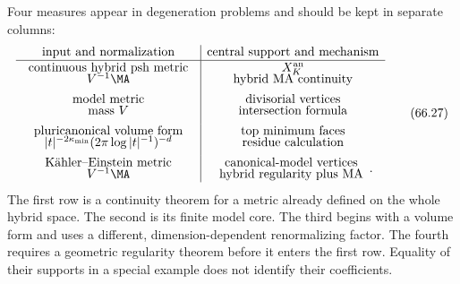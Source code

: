 Four measures appear in degeneration problems and should be kept in
separate columns:
\[
\begin{array}{c|c}
\text{input and normalization}&\text{central support and mechanism}\\
\hline
\begin{array}{c}
\text{continuous hybrid psh metric}\\[-1mm]V^{-1}\MA
\end{array}
&
\begin{array}{c}
X_K^{\mathrm{an}}\\[-1mm]\text{hybrid MA continuity}
\end{array}\\[3mm]
\begin{array}{c}
\text{model metric}\\[-1mm]\text{mass }V
\end{array}
&
\begin{array}{c}
\text{divisorial vertices}\\[-1mm]\text{intersection formula}
\end{array}\\[3mm]
\begin{array}{c}
\text{pluricanonical volume form}\\[-1mm]
|t|^{-2\kappa_{\min}}(2\pi\log|t|^{-1})^{-d}
\end{array}
&
\begin{array}{c}
\text{top minimum faces}\\[-1mm]\text{residue calculation}
\end{array}\\[3mm]
\begin{array}{c}
\text{K\"ahler--Einstein metric}\\[-1mm]V^{-1}\MA
\end{array}
&
\begin{array}{c}
\text{canonical-model vertices}\\[-1mm]
\text{hybrid regularity plus MA}
\end{array}.
\end{array}
\tag{66.27}\label{eq:hybrid-four-measure-ledger}
\]
The first row is a continuity theorem for a metric already defined on the
whole hybrid space.  The second is its finite model core.  The third begins
with a volume form and uses a different, dimension-dependent renormalizing
factor.  The fourth requires a geometric regularity theorem before it enters
the first row.  Equality of their supports in a special example does not
identify their coefficients.

